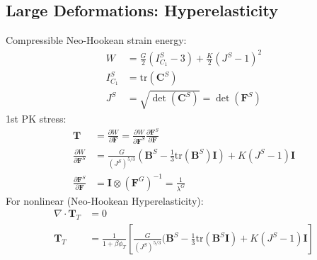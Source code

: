 \documentclass[12pt]{report}
\begin{document}
\subsection*{Large Deformations: Hyperelasticity}
Compressible Neo-Hookean strain energy:
\begin{align*}
W &= \frac{G}{2}(I_{C_1}^S-3)+\frac{K}{2}(J^S-1)^2 \\
I_{C_1}^S &= \textrm{tr}(\bm{C}^S) \\
J^S &= \sqrt{\det(\bm{C}^S)} = \det(\bm{F}^S)
\end{align*}
1st PK stress: 
\begin{align*}
\bm{T} &= \frac{\partial W}{\partial \bm{F}} = \frac{\partial W}{\partial \bm{F}^S} \frac{\partial \bm{F}^S}{\partial \bm{F}} \\
\frac{\partial W}{\partial \bm{F}^S} &= \frac{G}{(J^S)^{5/3}}(\bm{B}^S-\frac{1}{3}\textrm{tr}(\bm{B}^S)\bm{I})+K(J^S-1)\bm{I} \\
\frac{\partial \bm{F}^S}{\partial \bm{F}} &= \bm{I}\otimes(\bm{F}^G)^{-1} = \frac{1}{\lambda^G}
\end{align*}
For nonlinear (Neo-Hookean Hyperelasticity):
\begin{align*}
\nabla \cdot \bm{T}_T &= 0 \\
\bm{T}_T &= \frac{1}{1+\beta\phi_T}\left[ \frac{G}{(J^S)^{5/3}}(\bm{B}^S-\frac{1}{3}\textrm{tr}(\bm{B}^S\bm{I})+K(J^S-1)\bm{I} \right]
\end{align*}
\end{document}
